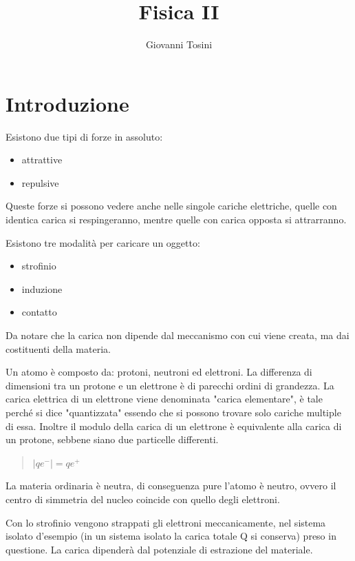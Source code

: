 \documentclass{book}
\begin{document}
    
\author{Giovanni Tosini}
\title{Fisica II}
\date{ }
\maketitle
\newpage
\tableofcontents
\newpage

\section{Introduzione}

Esistono due tipi di forze in assoluto:
\begin{itemize}
    \item  attrattive
    \item repulsive
\end{itemize}
Queste forze si possono vedere anche nelle singole cariche elettriche, quelle con identica carica
si respingeranno, mentre quelle con carica opposta si attrarranno.

Esistono tre modalità per caricare un oggetto:
\begin{itemize}
    \item strofinio
    \item induzione
    \item contatto
\end{itemize}
Da notare che la carica non dipende dal meccanismo con cui viene creata, ma dai costituenti
della materia.
\begin{center}
    \textbf{\textbf{
    }}    
\end{center}
Un atomo è composto da: protoni, neutroni ed elettroni. La differenza di dimensioni tra un protone
e un elettrone è di parecchi ordini di grandezza. La carica elettrica di un elettrone viene 
denominata "carica elementare", è tale perché si dice "quantizzata" essendo che si possono trovare solo
cariche multiple di essa. Inoltre il modulo della carica di un elettrone è equivalente alla carica di
 un protone, sebbene siano due particelle differenti.
 \begin{quote}
     \begin{math}
         |qe^-| = qe^+
     \end{math}
 \end{quote}
 La materia ordinaria è neutra, di conseguenza pure l'atomo è neutro, ovvero il centro di 
 simmetria del nucleo coincide con quello degli elettroni.

 Con lo strofinio vengono strappati gli elettroni meccanicamente, nel sistema isolato d'esempio
 (in un sistema isolato la carica totale Q si conserva) preso in questione. La carica dipenderà 
 dal potenziale di estrazione del materiale.
\end{document}
